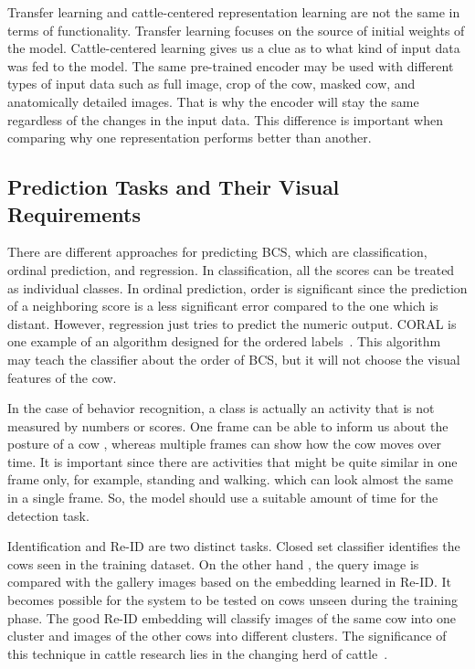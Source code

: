 Transfer learning and cattle-centered representation learning are not the same in terms of functionality. Transfer learning focuses on the source of initial weights of the model. Cattle-centered learning gives us a clue as to what kind of input data was fed to the model. The same pre-trained encoder may be used with different types of input data such as full image, crop of the cow, masked cow, and anatomically detailed images. That is why the encoder will stay the same regardless of the changes in the input data. This difference is important when comparing why one representation performs better than another.

\subsection{Prediction Tasks and Their Visual Requirements}

There are different approaches for predicting BCS, which are classification, ordinal prediction, and regression. In classification, all the scores can be treated as individual classes. In ordinal prediction, order is significant since the prediction of a neighboring score is a less significant error compared to the one which is distant.  However, regression just tries to predict the numeric output. CORAL is one example of an algorithm designed for the ordered labels~\cite{coral2020}. This algorithm may teach the classifier about the order of BCS, but it will not choose the visual features of the cow.

In the case of behavior recognition, a class is actually an activity that is not measured by numbers or scores. One frame can be able to inform us about the posture of a cow , whereas multiple frames can show how the cow moves over time. It is important since there are activities that might be quite similar in one frame only, for example, standing and walking. which can look almost the same in a single frame. So, the model should use a suitable amount of time for the detection task.

Identification and Re-ID are two distinct tasks. Closed set classifier identifies the cows seen in the training dataset. On the other hand , the query image is compared with the gallery images based on the embedding learned in Re-ID. It becomes possible for the system to be tested on cows unseen during the training phase. The good Re-ID embedding will classify images of the same cow into one cluster and images of the other cows into different clusters. The significance of this technique in cattle research lies in the changing herd of cattle~\cite{andrew2021opencows}.

